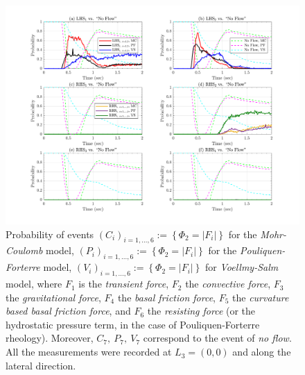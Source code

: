 \documentclass{article}
\begin{document}
\begin{figure}[H]
        \centering
        \includegraphics[width=1\textwidth]{InclinedPlane/LocalRecords/DominancePrY_L3.png}
        \caption{Probability of events $(C_i)_{i=1,...,6}:=\left\{\Phi_2=|F_i|\right\}$ for the \emph{Mohr-Coulomb} model, $(P_i)_{i=1,...,6}:=\left\{\Phi_2=|F_i|\right\}$ for the \emph{Pouliquen-Forterre} model, $(V_i)_{i=1,...,6}:=\left\{\Phi_2=|F_i|\right\}$ for \emph{Voellmy-Salm} model, where $F_1$ is the \emph{transient force}, $F_2$ the \emph{convective force}, $F_3$ the \emph{gravitational force}, $F_4$ the \emph{basal friction force}, $F_5$ the \emph{curvature based basal friction force}, and $F_6$ the \emph{resisting force} (or the hydrostatic pressure term, in the case of Pouliquen-Forterre rheology). Moreover, $C_7,\ P_7,\ V_7$ correspond to the event of \emph{no flow}. All the measurements were recorded at $L_3=(0,0)$ and along the lateral direction.}
        \label{fig:Ramp-FYDominance-L3}
\end{figure}
\end{document}
